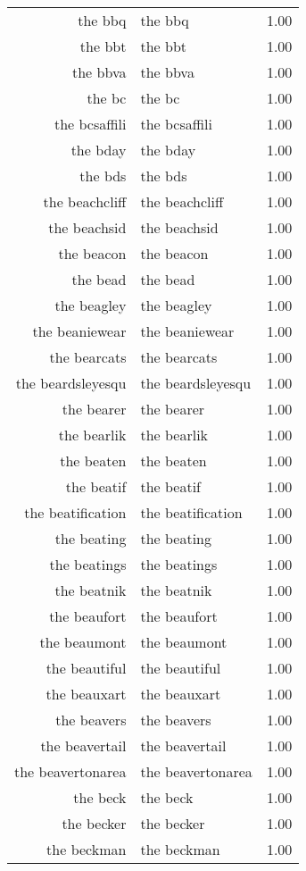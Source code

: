 \begin{table}[ht]
\begin{tabular}{rlr}
  the bbq & the bbq & 1.00 \\ 
  the bbt & the bbt & 1.00 \\ 
  the bbva & the bbva & 1.00 \\ 
  the bc & the bc & 1.00 \\ 
  the bcsaffili & the bcsaffili & 1.00 \\ 
  the bday & the bday & 1.00 \\ 
  the bds & the bds & 1.00 \\ 
  the beachcliff & the beachcliff & 1.00 \\ 
  the beachsid & the beachsid & 1.00 \\ 
  the beacon & the beacon & 1.00 \\ 
  the bead & the bead & 1.00 \\ 
  the beagley & the beagley & 1.00 \\ 
  the beaniewear & the beaniewear & 1.00 \\ 
  the bearcats & the bearcats & 1.00 \\ 
  the beardsleyesqu & the beardsleyesqu & 1.00 \\ 
  the bearer & the bearer & 1.00 \\ 
  the bearlik & the bearlik & 1.00 \\ 
  the beaten & the beaten & 1.00 \\ 
  the beatif & the beatif & 1.00 \\ 
  the beatification & the beatification & 1.00 \\ 
  the beating & the beating & 1.00 \\ 
  the beatings & the beatings & 1.00 \\ 
  the beatnik & the beatnik & 1.00 \\ 
  the beaufort & the beaufort & 1.00 \\ 
  the beaumont & the beaumont & 1.00 \\ 
  the beautiful & the beautiful & 1.00 \\ 
  the beauxart & the beauxart & 1.00 \\ 
  the beavers & the beavers & 1.00 \\ 
  the beavertail & the beavertail & 1.00 \\ 
  the beavertonarea & the beavertonarea & 1.00 \\ 
  the beck & the beck & 1.00 \\ 
  the becker & the becker & 1.00 \\ 
  the beckman & the beckman & 1.00 \\ 

\end{tabular}
\end{table}
